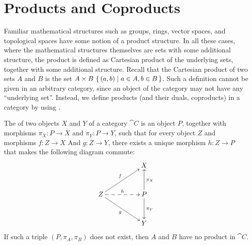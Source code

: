 \section{Products and Coproducts}\label{sec:ProductsCoproducts}

Familiar mathematical structures such as groups, rings, vector spaces, and topological spaces have some notion of a product structure. In all these cases, where the mathematical structures themselves are sets with some additional structure, the product is defined as Cartesian product of the underlying sets, together with some additional structure. Recall that the Cartesian product of two sets $A$ and $B$ is the set $A \times B \ \qty{\, (a, b) \mid a \in A, b \in B \,}$. Such a definition cannot be given in an arbitrary category, since an object of the category may not have any ``underlying set''. Instead, we define products (and their duals, coproducts) in a category by using .

The  of two objects $X$ and $Y$ of a category $\cat C$ is an object $P$, together with morphisms $\pi_X \colon P \to X$ and $\pi_Y \colon P \to Y$, such that for every object $Z$ and morphisms $f \colon Z \to X$ And $g \colon Z \to Y$, there exists a unique morphism $h \colon Z \to P$ that makes the following diagram commute:
\begin{equation*}
\xymatrix@=3em@C=5em{
& X \\
Z \ar[ru]^f \ar[rd]_g \ar@{-->}[r]^h & P \ar[u]_{\pi_X} \ar[d]^{\pi_Y}\\
& Y
}
\end{equation*}
If such a triple $(P, \pi_A, \pi_B)$ does not exist, then $A$ and $B$ have no product in $\cat C$.


